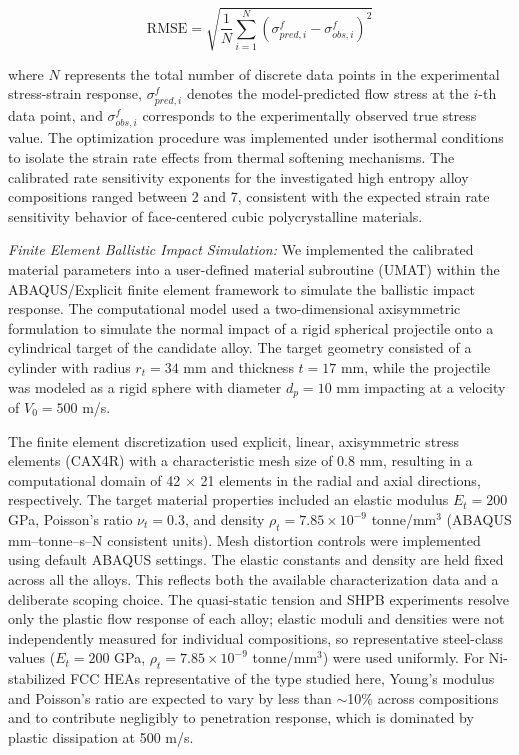 \documentclass[preprint,12pt,times]{elsarticle}  %
\begin{document}
\begin{equation}
\text{RMSE} = \sqrt{\frac{1}{N}\sum_{i=1}^{N}\left(\sigma_{pred,i}^f - \sigma_{obs,i}^f\right)^2}
\label{eq:rmse}
\end{equation}

where $N$ represents the total number of discrete data points in the experimental stress-strain response, $\sigma_{pred,i}^f$ denotes the model-predicted flow stress at the $i$-th data point, and $\sigma_{obs,i}^f$ corresponds to the experimentally observed true stress value. The optimization procedure was implemented under isothermal conditions to isolate the strain rate effects from thermal softening mechanisms. The calibrated rate sensitivity exponents for the investigated high entropy alloy compositions ranged between 2 and 7, consistent with the expected strain rate sensitivity behavior of face-centered cubic polycrystalline materials.

\emph{Finite Element Ballistic Impact Simulation:} We implemented the calibrated material parameters into a user-defined material subroutine (UMAT) within the ABAQUS/Explicit finite element framework to simulate the ballistic impact response. The computational model used a two-dimensional axisymmetric formulation to simulate the normal impact of a rigid spherical projectile onto a cylindrical target of the candidate alloy. The target geometry consisted of a cylinder with radius $r_t = 34$ mm and thickness $t = 17$ mm, while the projectile was modeled as a rigid sphere with diameter $d_p = 10$ mm impacting at a velocity of $V_0 = 500$ m/s.

The finite element discretization used explicit, linear, axisymmetric stress elements (CAX4R) with a characteristic mesh size of 0.8 mm, resulting in a computational domain of 42 $\times$ 21 elements in the radial and axial directions, respectively. The target material properties included an elastic modulus $E_t = 200$ GPa, Poisson's ratio $\nu_t = 0.3$, and density $\rho_t = 7.85 \times 10^{-9}$ tonne/mm$^3$ (ABAQUS mm--tonne--s--N consistent units). Mesh distortion controls were implemented using default ABAQUS settings. The elastic constants and density are held fixed across all the alloys. This reflects both the available characterization data and a deliberate scoping choice. The quasi-static tension and SHPB experiments resolve only the plastic flow response of each alloy; elastic moduli and densities were not independently measured for individual compositions, so representative steel-class values ($E_t = 200$ GPa, $\rho_t = 7.85 \times 10^{-9}$ tonne/mm$^3$) were used uniformly. For Ni-stabilized FCC HEAs representative of the type studied here, Young's modulus and Poisson's ratio are expected to vary by less than $\sim$10\% across compositions and to contribute negligibly to penetration response, which is dominated by plastic dissipation at 500 m/s. 
\end{document}
